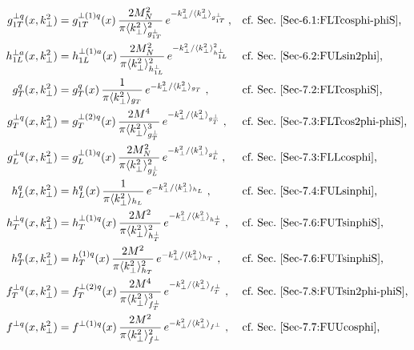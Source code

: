\documentclass[a4paper,11pt]{article}
\newcommand{\la}{\langle}
\newcommand{\ra}{\rangle}
\def\kperp{k_\perp}
\def\avkperp{\la \kperp^2 \ra}
\begin{document}
\begin{subequations}\begin{align}
	g_{1T}^{\perp q}(x,\kperp^2) 
	  &=	g_{1T}^{\perp (1) q}(x)\,
		\frac{2 M_N^2}{\pi \avkperp_{g_{1T}^\perp}^2}\,
		e^{-\kperp^2/{\avkperp_{g_{1T}^\perp}}}  \,, 
	  && 	\mbox{cf.\ Sec.~\ref{Sec-6.1:FLTcosphi-phiS},}
		\label{eq:g1t}\\
	h_{1L}^{\perp a}(x,\kperp^2) 
	  &= 	h_{1L}^{\perp (1) a}(x)\,
		\frac{2 M_N^2}{\pi{\avkperp_{h_{1L}^\perp}^2}}\,
		e^{-\kperp^2/{\avkperp_{h_{1L}^\perp}^2}}
	  && 	\mbox{cf.\ Sec.~\ref{Sec-6.2:FULsin2phi},}	
		\label{eq:h1l_final}\\
	g^{q}_{T}(x,\kperp^2) 
	  &=	g^{q}_{T}(x)\,\frac{1}{\pi \avkperp_{g_{T}}}\,
		e^{-\kperp^2/{\avkperp_{g_{T}}}}\;,
	  && 	\mbox{cf.\ Sec.~\ref{Sec-7.2:FLTcosphiS},}	
		\label{eq:gtnew} \\
	g^{\perp q}_{T}(x,\kperp^2) 
	  &= 	g^{\perp (2) q}_{T}(x)\,\frac{2 M^4}{\pi \avkperp^3_{g_{T}^{\perp} }}\,
		e^{-\kperp^2/{\avkperp_{g_{T}^{\perp} }}}\;,
	  && 	\mbox{cf.\ Sec.~\ref{Sec-7.3:FLTcos2phi-phiS},}	
		\label{eq:gtperpnew} \\
	g_{L}^{\perp q}(x,\kperp^2) 
	  &=	g_{L}^{\perp (1) q}(x)\,
		\frac{2 M_N^2}{\pi \avkperp_{g_{L}^\perp}^2}\,
		e^{-\kperp^2/{\avkperp_{g_{L}^\perp}}}  \,, 
	  && 	\mbox{cf.\ Sec.~\ref{Sec-7.3:FLLcosphi},}
		\label{eq:gLperp} \\
	h_L^q(x,\kperp^2) 
	  &= 	h_L^q(x) \,\frac{1}{\pi \avkperp_{h_{L}}}\,
		e^{-\kperp^2/{\avkperp_{h_{L}}}}\;,
	  && 	\mbox{cf.\ Sec.~\ref{Sec-7.4:FULsinphi},}
		\label{eq:hLnew}\\
	h_T^{\perp q}(x,\kperp^2) 
	  &=	h_T^{\perp (1) q}(x)\,\frac{2 M^2}{\pi \avkperp_{h_{T}^\perp}^2}\,
	  	e^{-\kperp^2/{\avkperp_{h_{T}^\perp}}}\;,
	  && 	\mbox{cf.\ Sec.~\ref{Sec-7.6:FUTsinphiS},}
		\label{eq:hTperpnew}\\
	h_T^{q}(x,\kperp^2) 
	  &=	h_T^{(1) q}(x) \,\frac{2 M^2}{\pi \avkperp_{h_{T}}^2}\,
		e^{-\kperp^2/{\avkperp_{h_{T}}}}\;,
	  && 	\mbox{cf.\ Sec.~\ref{Sec-7.6:FUTsinphiS},}
		\label{eq:hTnew}\\
	f^{\perp q}_{T}(x,\kperp^2) 
	  &= 	f^{\perp (2) q}_{T}(x)\,\frac{2 M^4}{\pi \avkperp^3_{f_{T}^{\perp} }}\,
		e^{-\kperp^2/{\avkperp_{f_{T}^{\perp} }}}\;,
	  && 	\mbox{cf.\ Sec.~\ref{Sec-7.8:FUTsin2phi-phiS},}
		\label{eq:ftperpnew}\\
	f^{\perp q}(x,\kperp^2) 
	  &= 	f^{\perp (1) q}(x) \,\frac{2 M^2}{\pi \avkperp_{f^\perp}^2}\,
		e^{-\kperp^2/{\avkperp_{f^\perp}}}\;,
	  && 	\mbox{cf.\ Sec.~\ref{Sec-7.7:FUUcosphi},}
		\label{eq:fperpnew}
\end{align}\end{subequations}
\end{document}
